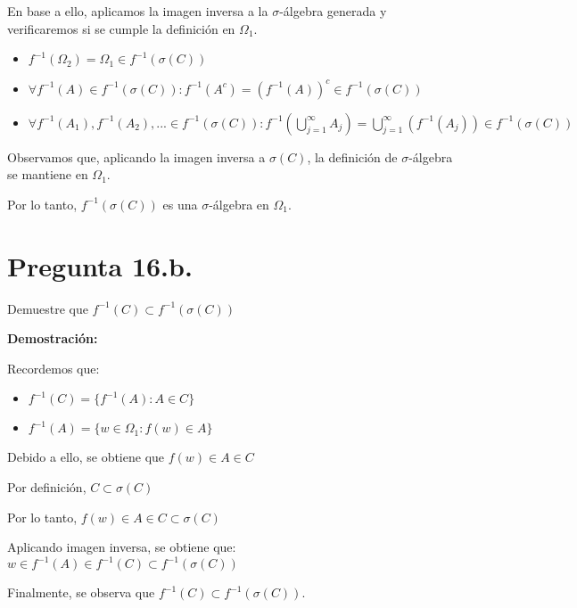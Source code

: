 \documentclass[11pt]{article}
\begin{document}
En base a ello, aplicamos la imagen inversa a la $\sigma$-álgebra generada y verificaremos si se cumple la definición en $\Omega_{1}$.

\begin{itemize}
	\item $\mathit{f}^{-1}(\Omega_{2}) = \Omega_{1} \in \mathit{f}^{-1}(\sigma(C))$
	\item $\forall \mathit{f}^{-1}(\mathit{A}) \in \mathit{f}^{-1}(\sigma(C)): \mathit{f}^{-1}(\mathit{A}^{c}) = (\mathit{f}^{-1}(\mathit{A}))^{c} \in \mathit{f}^{-1}(\sigma(C))$
	\item $\forall \mathit{f}^{-1}(\mathit{A}_{1}),\mathit{f}^{-1}(\mathit{A}_{2}), ... \in \mathit{f}^{-1}(\sigma(C)): \mathit{f}^{-1}(\bigcup^{\infty}_{j=1} A_{j}) = \bigcup^{\infty}_{j=1}(\mathit{f}^{-1}(A_{j})) \in \mathit{f}^{-1}(\sigma(C))$
\end{itemize}

Observamos que, aplicando la imagen inversa a $\sigma(C)$, la definición de $\sigma$-álgebra se mantiene en $\Omega_{1}$. 

Por lo tanto, $\mathit{f}^{-1} (\sigma(C))$ es una $\sigma$-álgebra en $\Omega_{1}$.

\section{Pregunta 16.b.}

Demuestre que  $\mathit{f}^{-1} (C) \subset \mathit{f}^{-1} (\sigma(C))$

\textbf{Demostración:}

Recordemos que:
\begin{itemize}
\item $\mathit{f}^{-1} (C) = \{\mathit{f}^{-1} (A): A \in C\}$
\item $\mathit{f}^{-1} (A) = \{w \in \Omega_{1}: \mathit{f}(w) \in A\}$
\end{itemize}

Debido a ello, se obtiene que $\mathit{f}(w) \in A \in C$

Por definición, $C \subset \sigma(C)$

Por lo tanto, $\mathit{f}(w) \in A \in C \subset \sigma(C)$

Aplicando imagen inversa, se obtiene que: $w \in \mathit{f}^{-1} (A) \in \mathit{f}^{-1} (C) \subset \mathit{f}^{-1} (\sigma(C))$

Finalmente, se observa que $\mathit{f}^{-1} (C) \subset \mathit{f}^{-1} (\sigma(C))$.
\end{document}
